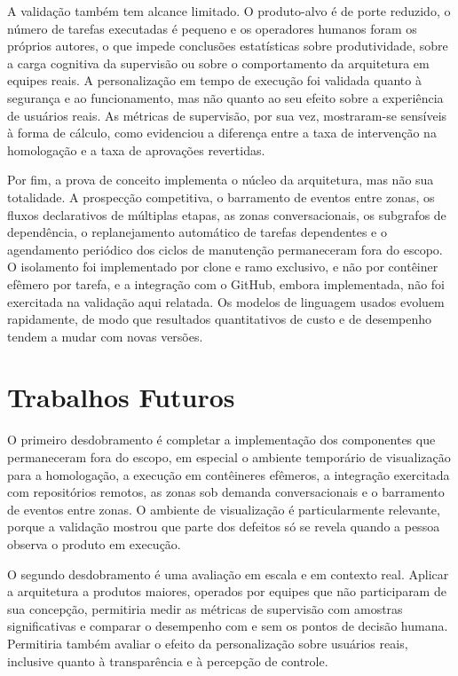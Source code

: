 A validação também tem alcance limitado. O produto-alvo é de porte reduzido, o número de tarefas executadas é pequeno e os operadores humanos foram os próprios autores, o que impede conclusões estatísticas sobre produtividade, sobre a carga cognitiva da supervisão ou sobre o comportamento da arquitetura em equipes reais. A personalização em tempo de execução foi validada quanto à segurança e ao funcionamento, mas não quanto ao seu efeito sobre a experiência de usuários reais. As métricas de supervisão, por sua vez, mostraram-se sensíveis à forma de cálculo, como evidenciou a diferença entre a taxa de intervenção na homologação e a taxa de aprovações revertidas.

Por fim, a prova de conceito implementa o núcleo da arquitetura, mas não sua totalidade. A prospecção competitiva, o barramento de eventos entre zonas, os fluxos declarativos de múltiplas etapas, as zonas conversacionais, os subgrafos de dependência, o replanejamento automático de tarefas dependentes e o agendamento periódico dos ciclos de manutenção permaneceram fora do escopo. O isolamento foi implementado por clone e ramo exclusivo, e não por contêiner efêmero por tarefa, e a integração com o GitHub, embora implementada, não foi exercitada na validação aqui relatada. Os modelos de linguagem usados evoluem rapidamente, de modo que resultados quantitativos de custo e de desempenho tendem a mudar com novas versões.

\section{Trabalhos Futuros}\label{sec:6.3}

O primeiro desdobramento é completar a implementação dos componentes que permaneceram fora do escopo, em especial o ambiente temporário de visualização para a homologação, a execução em contêineres efêmeros, a integração exercitada com repositórios remotos, as zonas sob demanda conversacionais e o barramento de eventos entre zonas. O ambiente de visualização é particularmente relevante, porque a validação mostrou que parte dos defeitos só se revela quando a pessoa observa o produto em execução.

O segundo desdobramento é uma avaliação em escala e em contexto real. Aplicar a arquitetura a produtos maiores, operados por equipes que não participaram de sua concepção, permitiria medir as métricas de supervisão com amostras significativas e comparar o desempenho com e sem os pontos de decisão humana. Permitiria também avaliar o efeito da personalização sobre usuários reais, inclusive quanto à transparência e à percepção de controle.

